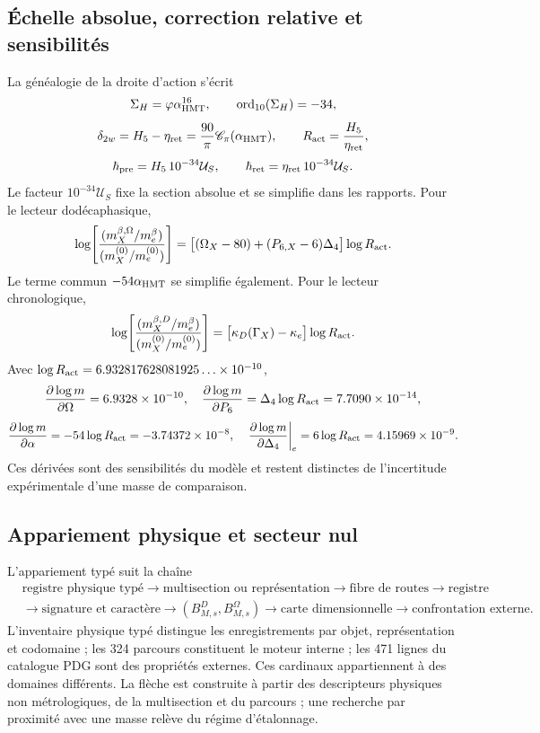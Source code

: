 \subsection{Échelle absolue, correction relative et sensibilités}

La généalogie de la droite d'action s'écrit
\[
 \Sigma_H=\varphi\alpha_{\rm HMT}^{16},
 \qquad \operatorname{ord}_{10}(\Sigma_H)=-34,
\]
\[
 \delta_{2w}=H_5-\eta_{\rm ret}
 =\frac{90}{\pi}\mathscr C_\pi(\alpha_{\rm HMT}),
 \qquad R_{\rm act}=\frac{H_5}{\eta_{\rm ret}},
\]
\[
 \hbar_{\rm pre}=H_5\,10^{-34}\mathcal U_S,
 \qquad
 \hbar_{\rm ret}=\eta_{\rm ret}\,10^{-34}\mathcal U_S.
\]
Le facteur \(10^{-34}\mathcal U_S\) fixe la section absolue et se simplifie dans les
rapports. Pour le lecteur dodécaphasique,
\begin{equation}
 \log\!\left[
 \frac{(m_X^{\beta,\Omega}/m_e^{\beta})}
 {(m_X^{(0)}/m_e^{(0)})}\right]
 =\bigl[(\Omega_X-80)+(P_{6,X}-6)\Delta_4\bigr]
 \log R_{\rm act}.
 \label{eq:razon-masa-omega-rev11}
\end{equation}
Le terme commun \(-54\alpha_{\rm HMT}\) se simplifie également. Pour le lecteur
chronologique,
\begin{equation}
 \log\!\left[
 \frac{(m_X^{\beta,D}/m_e^{\beta})}
 {(m_X^{(0)}/m_e^{(0)})}\right]
 =\bigl[\kappa_D(\Gamma_X)-\kappa_e\bigr]\log R_{\rm act}.
 \label{eq:razon-masa-D-rev11}
\end{equation}
Avec \(\log R_{\rm act}=6.932817628081925\ldots\times10^{-10}\),
\[
 \frac{\partial\log m}{\partial\Omega}=6.9328\times10^{-10},
 \quad
 \frac{\partial\log m}{\partial P_6}
 =\Delta_4\log R_{\rm act}=7.7090\times10^{-14},
\]
\[
 \frac{\partial\log m}{\partial\alpha}
 =-54\log R_{\rm act}=-3.74372\times10^{-8},
 \quad
 \left.\frac{\partial\log m}{\partial\Delta_4}\right|_e
 =6\log R_{\rm act}=4.15969\times10^{-9}.
\]
Ces dérivées sont des sensibilités du modèle et restent distinctes de
l'incertitude expérimentale d'une masse de comparaison.

\subsection{Appariement physique et secteur nul}

L'appariement typé suit la chaîne
\[
 \begin{aligned}
 &\text{registre physique typé}
 \longrightarrow\text{multisection ou représentation}
 \longrightarrow\text{fibre de routes}\longrightarrow\text{registre}\\
 &\longrightarrow\text{signature et caractère}
 \longrightarrow(B_{M,s}^D,B_{M,s}^\Omega)
 \longrightarrow\text{carte dimensionnelle}
 \longrightarrow\text{confrontation externe}.
 \end{aligned}
\]
L'inventaire physique typé distingue les enregistrements par objet, représentation et codomaine ; les 324 parcours constituent
le moteur interne ; les 471 lignes du catalogue PDG sont des propriétés externes.
Ces cardinaux appartiennent à des domaines différents. La flèche est construite
à partir des descripteurs physiques non métrologiques, de la multisection et du parcours ; une
recherche par proximité avec une masse relève du régime d'étalonnage.

